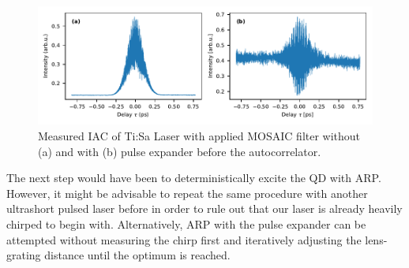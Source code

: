 \begin{figure}[H]
	\centering
	\includegraphics[width=\linewidth]{figures/chirp/plots/measured_chirped_laser_pulse_after_MOSAIC}
	\caption{Measured IAC of Ti:Sa Laser with applied MOSAIC filter without (a) and with (b) pulse expander before the autocorrelator.}
	\label{fig:measuredchirpedlaserpulseaftermosaic}
\end{figure}

The next step would have been to deterministically excite the \ac{QD} with \ac{ARP}.
However, it might be advisable to repeat the same procedure with another ultrashort pulsed laser before in order to rule out that our laser is already heavily chirped to begin with.
Alternatively, \ac{ARP} with the pulse expander can be attempted without measuring the chirp first and iteratively adjusting the lens-grating distance until the optimum is reached. 